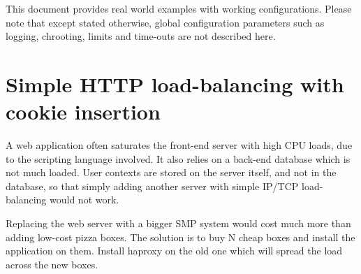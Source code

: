 This document provides real world examples with working configurations.
Please note that except stated otherwise, global configuration parameters
such as logging, chrooting, limits and time-outs are not described here.


\section{Simple HTTP load-balancing with cookie insertion}
\label{sec:simple_http_load_balancing_with_cookie_insertion}

A web application often saturates the front-end server with high CPU loads,
due to the scripting language involved. It also relies on a back-end database
which is not much loaded. User contexts are stored on the server itself, and
not in the database, so that simply adding another server with simple IP/TCP
load-balancing would not work.

\begin{figure}[!ht]
  \centering

\end{figure}

Replacing the web server with a bigger SMP system would cost much more than
adding low-cost pizza boxes. The solution is to buy N cheap boxes and install
the application on them. Install haproxy on the old one which will spread the
load across the new boxes.

